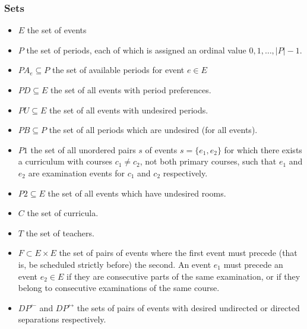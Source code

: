 \documentclass{article}
\theoremstyle{plain}
\numberwithin{theorem}{section}
\numberwithin{example}{section}
\theoremstyle{definition}
\begin{document}
\subsubsection*{Sets}
\begin{itemize}
    \item $E$ the set of events
    \item $P$ the set of periods, each of which is assigned an ordinal value
        $0,1,\dots, |P| - 1$.
    \item $PA_e \subseteq P$ the set of available periods for event $e \in E$
    \item $PD \subseteq E$ the set of all events with period preferences.
    \item $PU \subseteq E$ the set of all events with undesired periods.
    \item $PB \subseteq P$ the set of all periods which are undesired (for all
        events).
    \item $P1$ the set of all unordered pairs $s$ of events $s = \{e_1, e_2\}$
        for which there exists a curriculum with courses $c_1 \neq c_2$, not
        both primary courses, such that $e_1$ and $e_2$ are examination events
        for $c_1$ and $c_2$ respectively.
    \item $P2 \subseteq E$ the set of all events which have undesired rooms.
    \item $C$ the set of curricula.
    \item $T$ the set of teachers.
    \item $F \subset E \times E$ the set of pairs of events where the first
        event must precede (that is, be scheduled strictly before) the second.
        An event $e_1$ must precede an event $e_2 \in E$ if they are consecutive
        parts of the same examination, or if they belong to consecutive
        examinations of the same course.
    \item $DP^\leftarrow$ and $DP^\leftrightarrow$ the sets of pairs of events
        with desired undirected or directed separations respectively.
\end{itemize}
\end{document}
